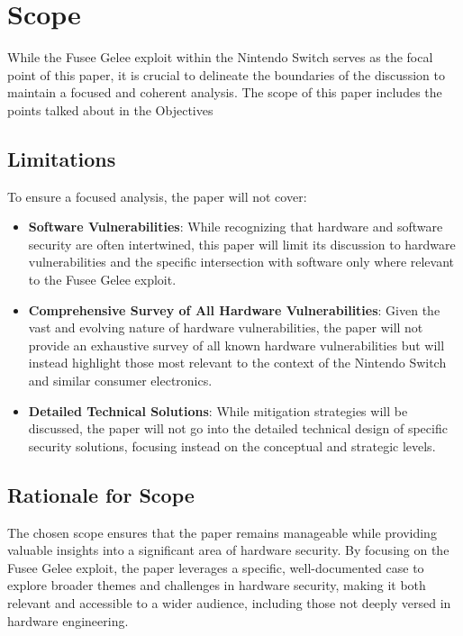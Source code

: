 \hypertarget{scope}{%
\section{Scope}\label{scope}}

While the Fusee Gelee exploit within the Nintendo Switch serves as the
focal point of this paper, it is crucial to delineate the boundaries of
the discussion to maintain a focused and coherent analysis. The scope of
this paper includes the points talked about in the Objectives

\hypertarget{limitations}{%
\subsection{Limitations}\label{limitations}}

To ensure a focused analysis, the paper will not cover:

\begin{itemize}
\item
  \textbf{Software Vulnerabilities}: While recognizing that hardware and
  software security are often intertwined, this paper will limit its
  discussion to hardware vulnerabilities and the specific intersection
  with software only where relevant to the Fusee Gelee exploit.
\item
  \textbf{Comprehensive Survey of All Hardware Vulnerabilities}: Given
  the vast and evolving nature of hardware vulnerabilities, the paper
  will not provide an exhaustive survey of all known hardware
  vulnerabilities but will instead highlight those most relevant to the
  context of the Nintendo Switch and similar consumer electronics.
\item
  \textbf{Detailed Technical Solutions}: While mitigation strategies
  will be discussed, the paper will not go into the detailed
  technical design of specific security solutions, focusing instead on
  the conceptual and strategic levels.
\end{itemize}

\hypertarget{rationale-for-scope}{%
\subsection{Rationale for Scope}\label{rationale-for-scope}}

The chosen scope ensures that the paper remains manageable while
providing valuable insights into a significant area of hardware
security. By focusing on the Fusee Gelee exploit, the paper leverages a
specific, well-documented case to explore broader themes and challenges
in hardware security, making it both relevant and accessible to a wider
audience, including those not deeply versed in hardware engineering.

